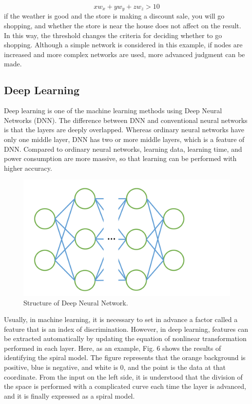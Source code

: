 \begin{equation}
xw_x+yw_y+zw_z > 10
\end{equation}
if the weather is good and the store is making a discount sale, you will go shopping, and whether the store is near the house does not affect on the result. In this way, the threshold changes the criteria for deciding whether to go shopping. Although a simple network is considered in this example, if nodes are increased and more complex networks are used, more advanced judgment can be made.
 

\subsection{Deep Learning}
Deep learning is one of the machine learning methods using Deep Neural Networks (DNN). The difference between DNN and conventional neural networks is that the layers are deeply overlapped. Whereas ordinary neural networks have only one middle layer, DNN has two or more middle layers, which is a feature of DNN. Compared to ordinary neural networks, learning data, learning time, and power consumption are more massive, so that learning can be performed with higher accuracy. 
\begin{figure}[t]
\begin{center}
\includegraphics[width=0.6\linewidth]{fig/dnn.pdf}
\end{center}
\caption{Structure of Deep Neural Network.}
\vspace*{-3pt}
\end{figure}
Usually, in machine learning, it is necessary to set in advance a factor called a feature that is an index of discrimination. However, in deep learning, features can be extracted automatically by updating the equation of nonlinear transformation performed in each layer. Here, as an example, Fig. 6 shows the results of identifying the spiral model. The figure represents that the orange background is positive, blue is negative, and white is 0, and the point is the data at that coordinate. From the input on the left side, it is understood that the division of the space is performed with a complicated curve each time the layer is advanced, and it is finally expressed as a spiral model.
